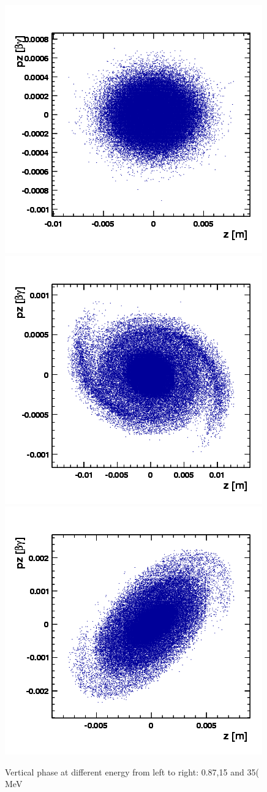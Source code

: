 \begin{figure}[ht]
  \begin{center} 

    \includegraphics[width=0.3\linewidth]{figures/cyclotron/Inj2-z-pz-step-870KeV.png}
    \includegraphics[width=0.3\linewidth]{figures/cyclotron/Inj2-z-pz-step-15MeV.png}
    \includegraphics[width=0.3\linewidth]{figures/cyclotron/Inj2-z-pz-step-30MeV.png}
    \caption{Vertical phase at different energy from left to right: 0.87,15 and 35( MeV}
    \label{fig:cyclphasespace}
  \end{center}
\end{figure}

